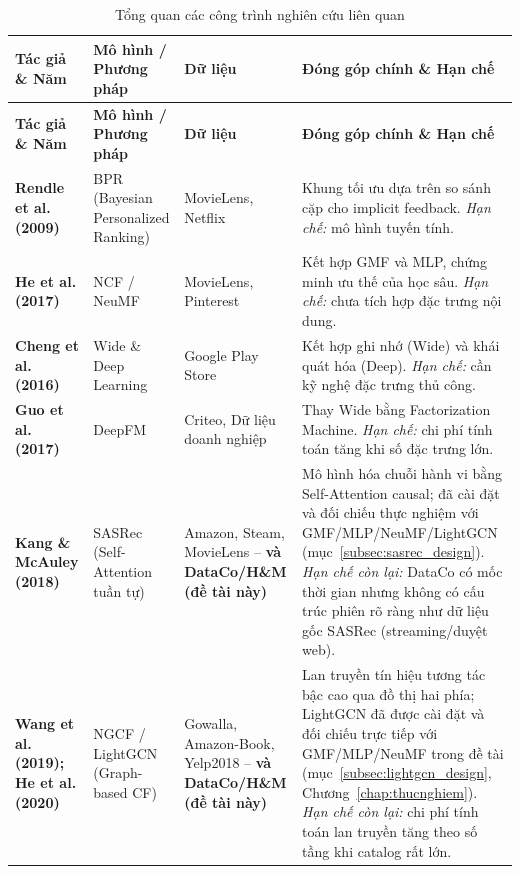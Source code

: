 \begin{xltabular}{\textwidth}{|p{3.2cm}|p{2.8cm}|p{2.5cm}|X|}
    \caption{Tổng quan các công trình nghiên cứu liên quan}
    \label{tab:related_work} \\
    \hline
    \textbf{Tác giả \& Năm} & \textbf{Mô hình / Phương pháp} & \textbf{Dữ liệu} & \textbf{Đóng góp chính \& Hạn chế} \\
    \hline
    \endfirsthead
    \hline
    \textbf{Tác giả \& Năm} & \textbf{Mô hình / Phương pháp} & \textbf{Dữ liệu} & \textbf{Đóng góp chính \& Hạn chế} \\
    \hline
    \endhead
    \hline
    \endfoot
    \textbf{Rendle et al. (2009)} \cite{rendle2009bpr} & BPR (Bayesian Personalized Ranking) & MovieLens, Netflix & Khung tối ưu dựa trên so sánh cặp cho implicit feedback. \textit{Hạn chế:} mô hình tuyến tính. \\
    \hline
    \textbf{He et al. (2017)} \cite{he2017ncf} & NCF / NeuMF & MovieLens, Pinterest & Kết hợp GMF và MLP, chứng minh ưu thế của học sâu. \textit{Hạn chế:} chưa tích hợp đặc trưng nội dung. \\
    \hline
    \textbf{Cheng et al. (2016)} \cite{cheng2016wide} & Wide \& Deep Learning & Google Play Store & Kết hợp ghi nhớ (Wide) và khái quát hóa (Deep). \textit{Hạn chế:} cần kỹ nghệ đặc trưng thủ công. \\
    \hline
    \textbf{Guo et al. (2017)} \cite{guo2017deepfm} & DeepFM & Criteo, Dữ liệu doanh nghiệp & Thay Wide bằng Factorization Machine. \textit{Hạn chế:} chi phí tính toán tăng khi số đặc trưng lớn. \\
    \hline
    \textbf{Kang \& McAuley (2018)} \cite{kang2018self} & SASRec (Self-Attention tuần tự) & Amazon, Steam, MovieLens -- \textbf{và DataCo/H\&M (đề tài này)} & Mô hình hóa chuỗi hành vi bằng Self-Attention causal; đã cài đặt và đối chiếu thực nghiệm với GMF/MLP/NeuMF/LightGCN (mục~\ref{subsec:sasrec_design}). \textit{Hạn chế còn lại:} DataCo có mốc thời gian nhưng không có cấu trúc phiên rõ ràng như dữ liệu gốc SASRec (streaming/duyệt web). \\
    \hline
    \textbf{Wang et al. (2019); He et al. (2020)} \cite{wang2019ngcf, he2020lightgcn} & NGCF / LightGCN (Graph-based CF) & Gowalla, Amazon-Book, Yelp2018 -- \textbf{và DataCo/H\&M (đề tài này)} & Lan truyền tín hiệu tương tác bậc cao qua đồ thị hai phía; LightGCN đã được cài đặt và đối chiếu trực tiếp với GMF/MLP/NeuMF trong đề tài (mục~\ref{subsec:lightgcn_design}, Chương~\ref{chap:thucnghiem}). \textit{Hạn chế còn lại:} chi phí tính toán lan truyền tăng theo số tầng khi catalog rất lớn. \\

\end{xltabular}
